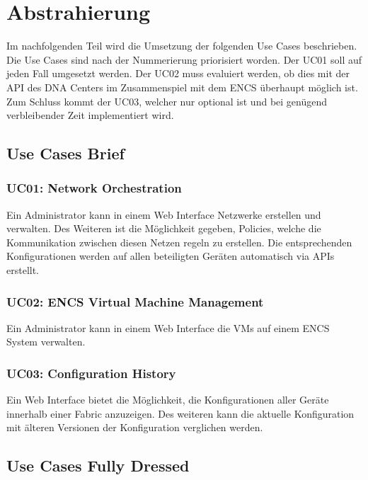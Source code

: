 \section{Abstrahierung}

Im nachfolgenden Teil wird die Umsetzung der folgenden Use Cases beschrieben. Die Use Cases sind nach der Nummerierung priorisiert worden. Der UC01 soll auf jeden Fall umgesetzt werden. Der UC02 muss evaluiert werden, ob dies mit der API des DNA Centers im Zusammenspiel mit dem ENCS überhaupt möglich ist. Zum Schluss kommt der UC03, welcher nur optional ist und bei genügend verbleibender Zeit implementiert wird.

\subsection{Use Cases Brief}

\subsubsection{UC01: Network Orchestration}
Ein Administrator kann in einem Web Interface Netzwerke erstellen und verwalten. Des Weiteren ist die Möglichkeit gegeben, Policies, welche die Kommunikation zwischen diesen Netzen regeln zu erstellen. Die entsprechenden Konfigurationen werden auf allen beteiligten Geräten automatisch via APIs erstellt.

\subsubsection{UC02: ENCS Virtual Machine Management}
Ein Administrator kann in einem Web Interface die VMs auf einem ENCS System verwalten.

\subsubsection{UC03: Configuration History}
Ein Web Interface bietet die Möglichkeit, die Konfigurationen aller Geräte innerhalb einer Fabric anzuzeigen. Des weiteren kann die aktuelle Konfiguration mit älteren Versionen der Konfiguration verglichen werden.

\subsection{Use Cases Fully Dressed}

